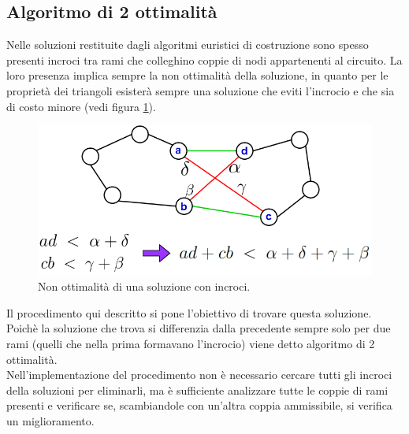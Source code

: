 \subsection{Algoritmo di 2 ottimalità}
Nelle soluzioni restituite dagli algoritmi euristici di costruzione sono spesso presenti incroci tra rami che colleghino coppie di nodi appartenenti al circuito. La loro presenza implica sempre la non ottimalità della soluzione, in quanto per le proprietà dei triangoli esisterà sempre una soluzione che eviti l'incrocio e che sia di costo minore (vedi figura \ref{cross}). 
\begin{figure}[H] 
\begin{center} 
  \includegraphics[scale=0.5]{Images/triangle_property}
  \caption{\footnotesize{Non ottimalità di una soluzione con incroci.}}
  \label{cross}
\end{center}
\end{figure}
Il procedimento qui descritto si pone l'obiettivo di trovare questa soluzione. Poichè la soluzione che trova si differenzia dalla precedente sempre solo per due rami (quelli che nella prima formavano l'incrocio) viene detto algoritmo di 2 ottimalità.\\
Nell'implementazione del procedimento non è necessario cercare tutti gli incroci della soluzioni per eliminarli, ma è sufficiente analizzare tutte le coppie di rami presenti e verificare se, scambiandole con un'altra coppia ammissibile, si verifica un miglioramento.
